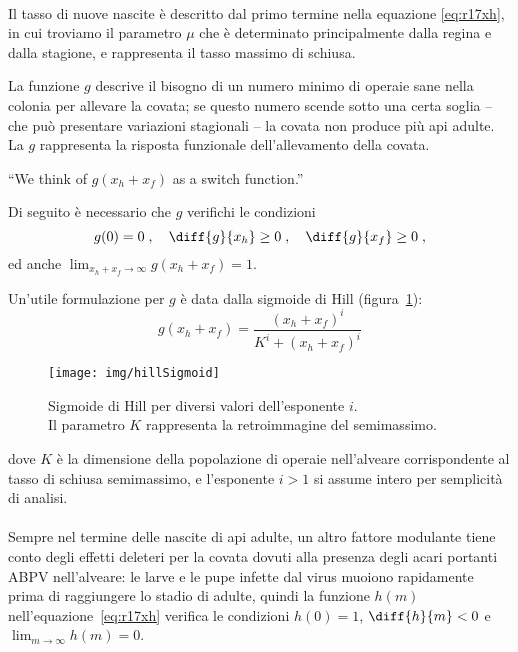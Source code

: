 \paragraph{}
Il tasso di nuove nascite è descritto dal primo termine nella equazione \eqref{eq:r17xh}, in cui troviamo il
parametro $\mu$ che è determinato principalmente dalla regina e dalla stagione, e rappresenta il tasso massimo
di schiusa.

La funzione $g$ descrive il bisogno di un numero minimo di operaie sane nella colonia per allevare la covata; se questo numero scende sotto una certa soglia -- che può presentare variazioni stagionali -- la covata non produce più api adulte.
La $g$ rappresenta la risposta funzionale dell'allevamento della covata.
\begin{displayquote}
``We think of $g(x_h + x_f)$ as a switch function.''
\end{displayquote}

Di seguito è necessario che $g$ verifichi le condizioni
$$g(0)=0 \; , \quad %
\diff{g}{x_h} \geq 0 \; , \quad %
\diff{g}{x_f} \geq 0 \; ,$$
ed anche $\lim_{x_h+x_f \to \infty} g(x_h+x_f)=1$.

Un'utile formulazione per $g$ è data dalla sigmoide di Hill (figura~\ref{img:hillSigmoid}):
\begin{equation}
    g(x_h + x_f) = \frac{ (x_h+x_f)^i }{ K^i + (x_h+x_f)^i }
    \label{eq:hillSigmoid}
\end{equation}

\begin{figure}
    \centering
    \texttt{[image: img/hillSigmoid]}

    \caption[Sigmoidi di Hill.]{Sigmoide di Hill per diversi valori dell'esponente $i$.
        \\ Il parametro $K$ rappresenta la retroimmagine del semimassimo.}
    \label{img:hillSigmoid}
\end{figure}

dove $K$ è la dimensione della popolazione di operaie nell'alveare corrispondente al tasso di schiusa semimassimo, e l'esponente $i>1$ si assume intero per semplicità di analisi.

\paragraph{}
Sempre nel termine delle nascite di api adulte, un altro fattore modulante tiene conto degli effetti deleteri per la covata dovuti alla presenza degli acari portanti ABPV nell'alveare: le larve e le pupe infette dal virus muoiono rapidamente prima di raggiungere lo stadio di adulte, quindi la funzione $h(m)$ nell'equazione~\ref{eq:r17xh} verifica le condizioni $h(0)=1$, $\diff{h}{m} <0$ e $\lim_{m \to \infty} h(m) = 0$.

